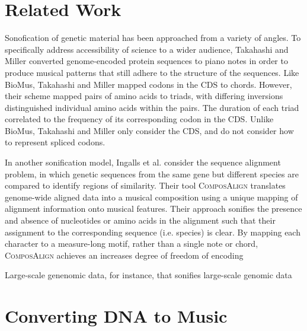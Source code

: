 \documentclass[letterpaper]{article}
\begin{document}
\section{Related Work}

Sonofication of genetic material has been approached from a variety of angles. To specifically address accessibility of science to a wider audience, Takahashi and Miller converted genome-encoded protein sequences to piano notes in order to produce musical patterns that still adhere to the structure of the sequences. Like BioMus, Takahashi and Miller mapped codons in the CDS to chords. However, their scheme mapped pairs of amino acids to triads, with differing inversions distinguished individual amino acids within the pairs. The duration of each triad correlated to the frequency of its corresponding codon in the CDS. Unlike BioMus, Takahashi and Miller only consider the CDS, and do not consider how to represent spliced codons. %


In another sonification model, Ingalls et al. consider the sequence alignment problem, in which genetic sequences from the same gene but different species are compared to identify regions of similarity. Their tool \textsc{ComposAlign} translates genome-wide aligned data into a musical composition using a unique mapping of alignment information onto musical features. Their approach sonifies the presence and absence of nucleotides or amino acids in the alignment such that their assignment to the corresponding sequence (i.e. species) is clear. By mapping each character to a measure-long motif, rather than a single note or chord, \textsc{ComposAlign} achieves an increases degree of freedom of encoding

Large-scale genenomic data, for instance, 
 that sonifies large-scale genomic data





\section{Converting DNA to Music}
\end{document}
